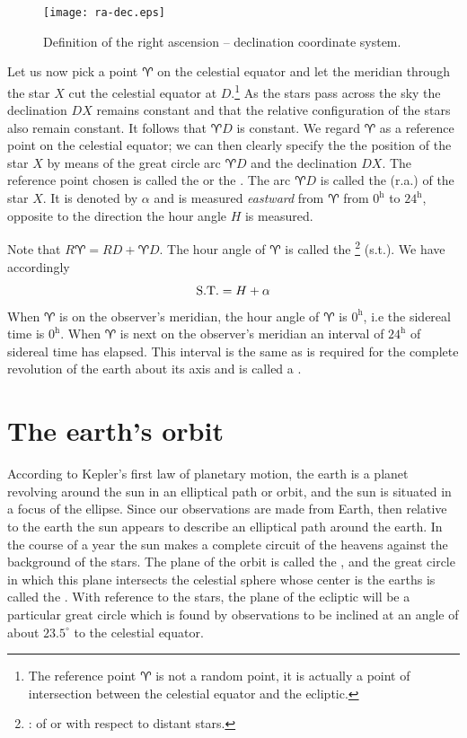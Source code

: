 \begin{figure}[h]
\centering
\texttt{[image: ra-dec.eps]}
\caption{Definition of the right ascension -- declination coordinate system.}
\label{fig:ra-dec}
\end{figure}

Let us now pick a point $\aries$ on the celestial equator and let the
meridian through the star $X$ cut the celestial equator at $D$.\footnote{The reference
point $\aries$ is not a random point, it is actually a point of intersection between the
celestial equator and the ecliptic.} As the
stars pass across the sky the declination $DX$ remains constant and
that the relative configuration of the stars also remain constant. It
follows that $\aries D$ is constant. We regard $\aries$ as a reference
point on the celestial equator; we can then clearly specify the the
position of the star $X$ by means of the great circle arc $\aries D$
and the declination $DX$. The reference point chosen is called the
{} or the {}. The arc
$\aries D$ is called the {} ({\sc r.a.}) of the
star $X$. It is denoted by $\alpha$ and is measured {\it eastward}
from $\aries$ from $0^{\mathrm{h}}$ to $24^{\mathrm{h}}$, opposite to the direction the hour
angle $H$ is measured. 

Note that $R\aries =RD+\aries D$. The hour angle of $\aries$ is called
the {}\footnote{{}: of or with respect to distant stars.} 
 ({\sc s.t.}). We have accordingly 
\[
{\rm S.T.}=H+\alpha
\]
When $\aries$ is on the observer's meridian, the hour angle of
$\aries$ is $0^{\mathrm{h}}$, i.e the sidereal time is $0^{\mathrm{h}}$. When $\aries$
is next on the observer's meridian an interval of $24^{\mathrm{h}}$ of sidereal
time has elapsed. This interval is the same as is required for the
complete revolution of the earth about its axis and is called a
{}. 

\section{The earth's orbit}

According to Kepler's first law of planetary motion, the earth is a 
planet revolving around the sun in an elliptical path or orbit, and
the sun is situated in a focus of the ellipse. Since our observations
are made from Earth, then relative to the earth the sun appears to
describe an elliptical path around the earth. In the course of a year
the sun makes a complete circuit of the heavens against the background
of the stars. The plane of the orbit is called the {},  and the great circle in which this plane intersects the
celestial sphere whose center is the earths is called the 
{}. With reference to the stars, the plane of the ecliptic
will be a particular great circle which is found by observations to be
inclined at an angle of about $23.5^\circ$ to the celestial
equator. 

